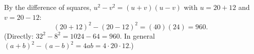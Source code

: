 By the difference of squares, $u^2-v^2=(u+v)(u-v)$ with $u=20+12$ and $v=20-12$:
\[
(20+12)^2-(20-12)^2=(40)(24)=\boxed{960}.
\]
(Directly: $32^2-8^2=1024-64=960$. In general $(a+b)^2-(a-b)^2=4ab=4\cdot20\cdot12$.)
